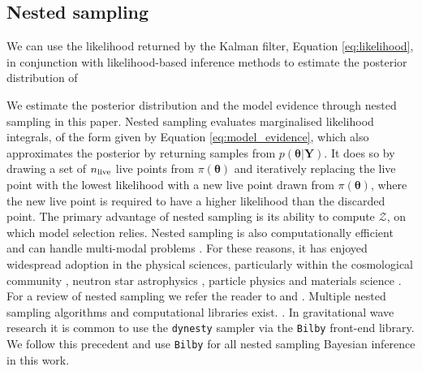 \documentclass[fleqn,usenatbib,useAMS]{mnras}
\begin{document}


\subsection{Nested sampling}\label{sec:nested_sampling}
We can use the likelihood returned by the Kalman filter, Equation \eqref{eq:likelihood}, in conjunction with likelihood-based inference methods to estimate the posterior distribution of 






 We estimate the posterior distribution and the model evidence through nested sampling \citep{Skilling} in this paper. Nested sampling evaluates marginalised likelihood integrals, of the form given by Equation \eqref{eq:model_evidence}, which also approximates the posterior by returning samples from $p(\boldsymbol{\theta} | \boldsymbol{Y})$. It does so by drawing a set of $n_{\rm live}$ live points from $\pi(\boldsymbol{\theta})$ and iteratively replacing the live point with the lowest likelihood with a new live point drawn from $\pi(\boldsymbol{\theta})$, where the new live point is required to have a higher likelihood than the discarded point. The primary advantage of nested sampling is its ability to compute $\mathcal{Z}$, on which model selection relies. Nested sampling is also computationally efficient and can handle multi-modal problems \citep{Ashton2022}. For these reasons, it has enjoyed widespread adoption in the physical sciences, particularly within the cosmological community \citep{Mukherjee2006,Feroz2008,Handley2015}, neutron star astrophysics \citep{Myers2021MNRAS.502.3113M,Meyers2021,Melatos2023}, particle physics \citep{proceedings2019033014} and materials science \citep{2009arXiv0906materials}. For a review of nested sampling we refer the reader to \cite{Buchner2021} and \cite{Ashton2022}. Multiple nested sampling algorithms and computational libraries exist. \citep[e.g.][]{Feroz2008,Feroz2009,Handley2015,dynesty2020,UltraNest2021}. In gravitational wave research it is common to use the \texttt{dynesty} sampler \citep{dynesty2020} via the \texttt{Bilby} \citep{bilby.507.2037A} front-end library. We follow this precedent and use \texttt{Bilby} for all nested sampling Bayesian inference in this work. \newline 
 
\end{document}
